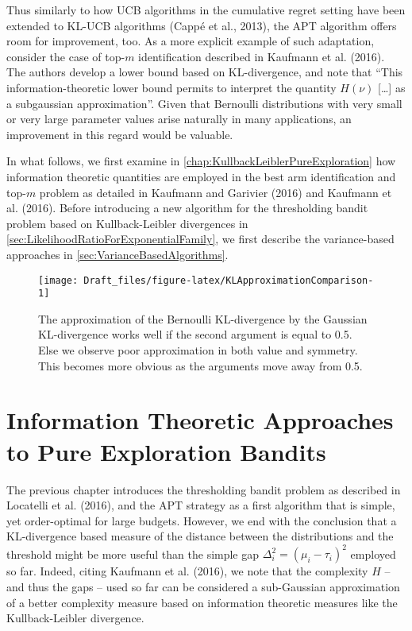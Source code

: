 \documentclass[11pt,]{article}
\begin{document}
Thus similarly to how UCB algorithms in the cumulative regret setting
have been extended to KL-UCB algorithms (Cappé et al., 2013), the APT
algorithm offers room for improvement, too. As a more explicit example
of such adaptation, consider the case of top-\(m\) identification
described in Kaufmann et al. (2016). The authors develop a lower bound
based on KL-divergence, and note that ``This information-theoretic lower
bound permits to interpret the quantity \(H(\nu)\) {[}\ldots{}{]} as a
subgaussian approximation''. Given that Bernoulli distributions with
very small or very large parameter values arise naturally in many
applications, an improvement in this regard would be valuable.

In what follows, we first examine in
\autoref{chap:KullbackLeiblerPureExploration} how information theoretic
quantities are employed in the best arm identification and top-\(m\)
problem as detailed in Kaufmann and Garivier (2016) and Kaufmann et al.
(2016). Before introducing a new algorithm for the thresholding bandit
problem based on Kullback-Leibler divergences in
\autoref{sec:LikelihoodRatioForExponentialFamily}, we first describe the
variance-based approaches in \autoref{sec:VarianceBasedAlgorithms}.

\begin{figure}

{\centering \texttt{[image: Draft\_files/figure-latex/KLApproximationComparison-1]} 

}

\caption{The approximation of the Bernoulli KL-divergence by the Gaussian KL-divergence works well if the second argument is equal to 0.5. Else we observe poor approximation in both value and symmetry. This becomes more obvious as the arguments move away from 0.5.}\label{fig:KLApproximationComparison}
\end{figure}

\newpage

\section{\texorpdfstring{Information Theoretic Approaches to Pure
Exploration Bandits
\label{chap:KullbackLeiblerPureExploration}}{Information Theoretic Approaches to Pure Exploration Bandits }}\label{information-theoretic-approaches-to-pure-exploration-bandits}

The previous chapter introduces the thresholding bandit problem as
described in Locatelli et al. (2016), and the APT strategy as a first
algorithm that is simple, yet order-optimal for large budgets. However,
we end with the conclusion that a KL-divergence based measure of the
distance between the distributions and the threshold might be more
useful than the simple gap \(\Delta^2_i = (\mu_i - \tau_i)^2\) employed
so far. Indeed, citing Kaufmann et al. (2016), we note that the
complexity \(H\) -- and thus the gaps -- used so far can be considered a
sub-Gaussian approximation of a better complexity measure based on
information theoretic measures like the Kullback-Leibler divergence.
\end{document}
